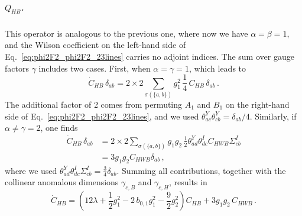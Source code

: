 \subparagraph{\texorpdfstring{$Q_{HB}$}{Q_HB}.} This operator is analogous to the previous one, where now we have $\alpha=\beta=1$, and the Wilson coefficient on the left-hand side of Eq.~\eqref{eq:phi2F2_phi2F2_23lines} carries no adjoint indices. The sum over gauge factors $\gamma$ includes two cases. First, when $\alpha=\gamma=1$, which leads to
\begin{equation}
    \dot{C}_{HB}\, \delta_{ab} = 2\times 2\sum_{\sigma(\{a , b\})} g_1^2\, \frac{1}{4}\, C_{HB}\, \delta_{ab} \,.
\end{equation}
The additional factor of 2 comes from permuting $A_1$ and $B_1$ on the right-hand side of Eq.~\eqref{eq:phi2F2_phi2F2_23lines}, and we used $\theta_{ac}^Y\theta_{cb}^Y=\delta_{ab}/4$.
Similarly, if $\alpha\ne\gamma=2$, one finds
\begin{align}
    \dot{C}_{HB}\, \delta_{ab} & = 2\times 2 \sum_{\sigma(\{a , b\})} g_1 g_2\, \frac{1}{2} \theta^Y_{ad}\theta^{I}_{dc} C_{HWB} \Sigma_{cb}^I \nonumber\\
    & = 3 g_1 g_2 C_{HWB}  \delta_{ab} \,,
\end{align}
where we used
$\theta^Y_{ad}\theta^{I}_{dc} \Sigma_{cb}^I = \frac{3}{4} \delta_{ab}$.
Summing all contributions, together with the collinear anomalous dimensions $\gamma_{c,B}$ and $\gamma_{c,H}$, results in
\begin{equation}
     \dot{C}_{HB} = \left(12\lambda+\frac{1}{2} g_1^2 -2\,b_{0,1}g_1^2 - \frac{9}{2}g_2^2 \right) C_{HB} + 3 g_1 g_2 \,C_{HWB}\,.
\end{equation}

